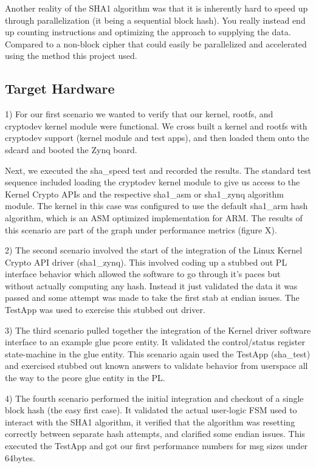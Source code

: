 \documentclass[journal]{IEEEtran}
\begin{document}
Another reality of the SHA1 algorithm was that it is inherently hard to speed up through parallelization (it being a sequential block hash).  You really instead end up counting instructions and optimizing the approach to supplying the data.  Compared to a non-block cipher that could easily be parallelized and accelerated using the method this project used. 
\subsection{Target Hardware}
1) For our first scenario we wanted to verify that our kernel, rootfs, and cryptodev kernel module were functional.  We cross built a kernel and rootfs with cryptodev support (kernel module and test apps), and then loaded them onto the sdcard and booted the Zynq board.  

Next, we executed the sha\_speed test and recorded the results.  The standard test sequence included loading the cryptodev kernel module to give us access to the Kernel Crypto APIs and the respective sha1\_asm or sha1\_zynq algorithm module.  
The kernel in this case was configured to use the default sha1\_arm hash algorithm, which is an ASM optimized implementation for ARM.  The results of this scenario are part of the graph under performance metrics (figure X).

2) The second scenario involved the start of the integration of the Linux Kernel Crypto API driver (sha1\_zynq).  This involved coding up a stubbed out PL interface behavior which allowed the software to go through it’s paces but without actually computing any hash.  Instead it just validated the data it was passed and some attempt was made to take the first stab at endian issues.  The TestApp was used to exercise this stubbed out driver.

3) The third scenario pulled together the integration of the Kernel driver software interface to an example glue pcore entity.  It validated the control/status register state-machine in the glue entity.  This scenario again used the TestApp (sha\_test) and exercised stubbed out known answers to validate behavior from userspace all the way to the pcore glue entity in the PL.

4) The fourth scenario performed the initial integration and checkout of a single block hash (the easy first case).  It validated the actual user-logic FSM used to interact with the SHA1 algorithm, it verified that the algorithm was resetting correctly between separate hash attempts, and clarified some endian issues.  This executed the TestApp and got our first performance numbers for msg sizes under 64bytes.
\end{document}
